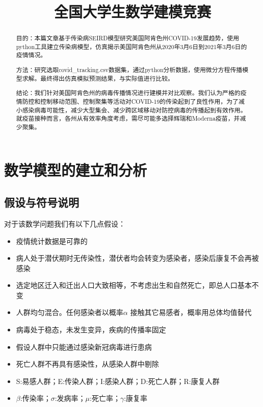 \documentclass{cumcmthesis}
\title{全国大学生数学建模竞赛}
\begin{document}
\maketitle
\begin{abstract}
    目的：本篇文章基于传染病SEIRD模型研究美国阿肯色州COVID-19发展趋势，使用python工具建立传染病模型，仿真揭示美国阿肯色州从2020年3月6日到2021年3月6日的疫情情况。

    方法：研究选取covid\_tracking.csv数据集，通过python分析数据，使用微分方程传播模型求解。最终得出仿真模拟预测结果，与实际值进行比较。

    结论：我们针对美国阿肯色州的病毒传播情况进行建模并对比观察。我们认为严格的疫情防控和控制移动范围、控制聚集等活动对COVID-19的传染起到了良性作用，为了减小感染病毒可能性，减少大型集会、减少跨区域移动对防控病毒的传播起到有效作用。就疫苗接种而言，各州从有效率角度考虑，需尽可能多选择辉瑞和Moderna疫苗，并减少聚集。


\end{abstract}


\tableofcontents

\clearpage
\section{数学模型的建立和分析}
\subsection{假设与符号说明}
对于该数学问题我们有以下几点假设：
\begin{itemize}
    \item 疫情统计数据是可靠的
    \item 病人处于潜伏期时无传染性，潜伏者均会转变为感染者，感染后康复不会再被感染
    \item 选定地区迁入和迁出人口大致相等，不考虑出生和自然死亡，即总人口基本不变
    \item 人群均匀混合。任何感染者以概率$\alpha$ 接触其它易感者，概率用总体均值替代
    \item 病毒处于稳态，未发生变异，疾病的传播率固定
    \item 假设人群中只能通过感染新冠病毒进行患病
    \item 死亡人群不再具有感染性，从感染人群中剔除
    \item S:易感人群；E:传染人群；I:感染人群；D:死亡人群；R:康复人群
    \item $\beta$:传染率；$\sigma$:发病率；$\mu$:死亡率；$\gamma$:康复率
\end{itemize}
\end{document}
